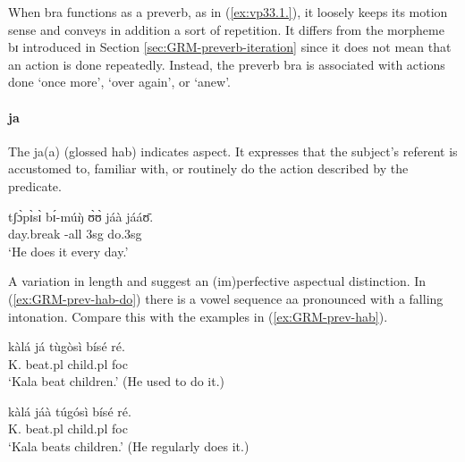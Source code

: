 \begin{exe}
\begin{exe}
\begin{exe}
\begin{exe}
\begin{exe}
\begin{exe}
\begin{exe}
\begin{exe}
\begin{exe}
\begin{exe}
\begin{exe}
\begin{exe}
When {\sls bra} functions as a preverb, as in (\ref{ex:vp33.1.}),  it loosely keeps its motion sense and conveys in addition a sort of repetition. It differs from the morpheme {\sls bɪ} introduced in Section \ref{sec:GRM-preverb-iteration} since it does not mean that an action is done repeatedly.  Instead, the preverb {\sls bra} is associated with actions done `once more', `over again',  or `anew'.

\paragraph{ja}
\label{sec:GRM-preverb-hab}

The  {\sls ja(a)} (glossed {\sc hab})  indicates  aspect. It 
expresses that the subject's referent is accustomed to, familiar with, or 
routinely do the action described by the predicate.


\ea\label{ex:GRM-prev-hab-do}
\gll tʃɔ̀pɪ̀sɪ̀ bɪ́-múŋ̀ ʊ̀ʊ̀ jáà jááʊ̄.\\
 day.break {\itr}-all {\sc 3sg} {\hab} do.{\sc 3sg}\\
\glt `He does it every day.'
\z 

 A variation in  length and  suggest  an (im)perfective aspectual 
distinction. In   (\ref{ex:GRM-prev-hab-do})  there is a  vowel sequence {\sls 
aa} pronounced with a falling intonation. Compare this with the examples in 
(\ref{ex:GRM-prev-hab}). 



 

\ea\label{ex:GRM-prev-hab}
\ea\label{ex:GRM-prev-hab-do-pfv}
\gll  kàlá já tùgòsì bísé ré.\\
 K.  {\hab}  beat.{\sc pl} child.{\sc pl} {\sc foc}\\
\glt `Kala beat children.' (He used to do it.)

\ex\label{ex:GRM-prev-hab-impv}
\gll  kàlá jáà túgósì bísé ré.\\
K.  {\hab}  beat.{\sc pl} child.{\sc pl} {\sc foc}\\
\glt `Kala beats children.' (He regularly does it.)


\end{exe}
\end{exe}
\end{exe}
\end{exe}
\end{exe}
\end{exe}
\end{exe}
\end{exe}
\end{exe}
\end{exe}
\end{exe}
\end{exe}

